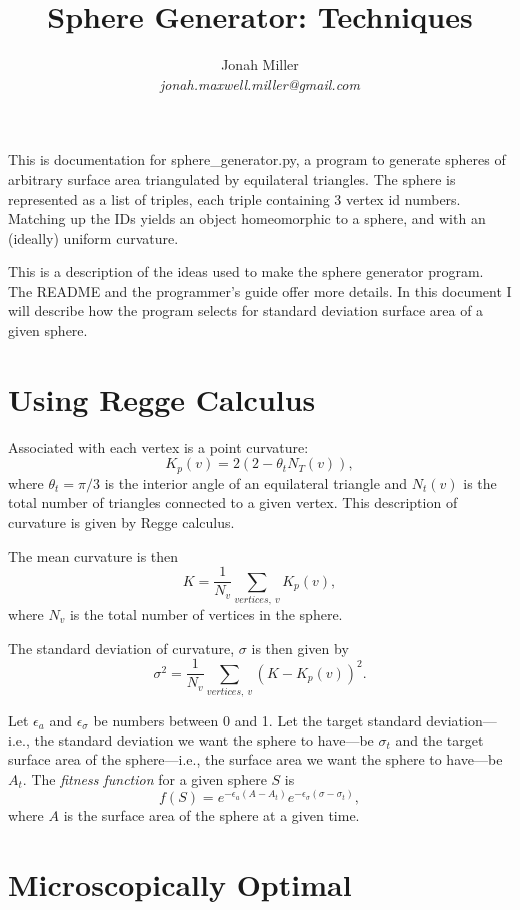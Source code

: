 \documentclass{article}
\title{Sphere Generator: Techniques}
\author{Jonah Miller\\\textit{jonah.maxwell.miller@gmail.com}}
\begin{document}
\maketitle

This is documentation for sphere\_generator.py, a program to generate
spheres of arbitrary surface area triangulated by equilateral
triangles. The sphere is represented as a list of triples, each triple
containing 3 vertex id numbers. Matching up the IDs yields an object
homeomorphic to a sphere, and with an (ideally) uniform curvature.

This is a description of the ideas used to make the sphere generator
program. The README and the programmer's guide offer more details. In
this document I will describe how the program selects for standard
deviation surface area of a given sphere.
\section{Using Regge Calculus}
Associated with each vertex is a point curvature:
$$K_p(v) = 2(2 - \theta_t N_T(v)),$$
where $\theta_t = \pi/3$ is the interior angle of an equilateral
triangle and $N_t(v)$ is the total number of triangles connected to a
given vertex. This description of curvature is given by Regge
calculus.

The mean curvature is then 
$$K = \frac{1}{N_v}\sum_{vertices, \ v} K_p(v),$$
where $N_v$ is the total number of vertices in the sphere.

The standard deviation of curvature, $\sigma$ is then given by
$$\sigma^2 = \frac{1}{N_v} \sum_{vertices, \ v}\left(K - K_p(v)\right)^2.$$

Let $\epsilon_a$ and $\epsilon_\sigma$ be numbers between 0 and 1. Let
the target standard deviation---i.e., the standard deviation we want
the sphere to have---be $\sigma_t$ and the target surface area of the
sphere---i.e., the surface area we want the sphere to have---be
$A_t$. The \textit{fitness function} for a given sphere $S$ is
$$f(S) = e^{-\epsilon_a (A - A_t)}e^{-\epsilon_\sigma (\sigma - \sigma_t)},$$
where $A$ is the surface area of the sphere at a given time. 
\section{Microscopically Optimal}
\end{document}

